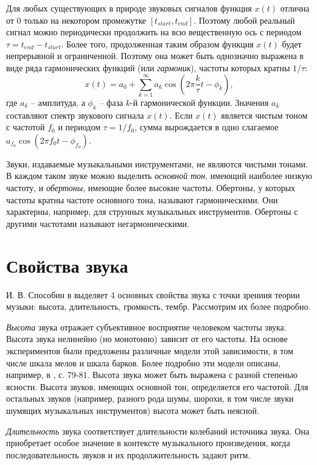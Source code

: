 Для любых существующих в природе звуковых сигналов функция $x(t)$ отлична от 0
только на некотором промежутке $[t_{start}, t_{end}]$. Поэтому любой реальный
сигнал можно периодически продолжить на всю вещественную ось с периодом $\tau =
t_{end} - t_{start}$. Более того, продолженная таким образом функция $x(t)$
будет непрерывной и ограниченной. Поэтому она может быть однозначно выражена в
виде ряда гармонических функций (или \emph{гармоник}), частоты которых кратны
$1 / \tau$: $$x(t) = a_0 + \sum_{k=1}^\infty a_k \cos \left(2\pi \frac{k}{\tau}
t - \phi_k \right),$$ где $a_k$ -- амплитуда, а $\phi_k$ -- фаза $k$-й
гармонической функции. Значения $a_k$ составляют спектр звукового сигнала
$x(t)$. Если $x(t)$ является чистым тоном с частотой $f_0$ и периодом $\tau =
1/f_0$, сумма вырождается в одно слагаемое $a_{f_0} \cos(2 \pi f_0 t -
\phi_{f_0})$.

Звуки, издаваемые музыкальными инструментами, не являются чистыми тонами. В
каждом таком звуке можно выделить \emph{основной тон}, имеющий наиболее низкую
частоту, и \emph{обертоны}, имеющие более высокие частоты. Обертоны, у которых
частоты кратны частоте основного тона, называют гармоническими. Они
характерны, например, для струнных музыкальных инструментов. Обертоны с другими
частотами называют негармоническими.

\section{Свойства звука} \label{sectT_prop}

И. В. Способин в \cite{Sposobin2012} выделяет 4 основных свойства звука с точки
зрениия теории музыки: высота, длительность, громкость, тембр. Рассмотрим их
более подробно.

\emph{Высота} звука отражает субъективное восприятие человеком частоты звука.
Высота звука нелинейно (но монотонно) зависит от его частоты. На основе
экспериментов были предложены различные модели этой зависимости, в том числе
шкала мелов и шкала барков. Более подробно эти модели описаны, например, в
\cite{Lerch2012}, с. 79-81. Высота звука может быть выражена с разной степенью
ясности. Высота звуков, имеющих основной тон, определяется его частотой. Для
остальных звуков (например, разного рода шумы, шорохи, в том числе звуки шумящих
музыкальных инструментов) высота может быть неясной.

\emph{Длительность} звука соответствует длительности колебаний источника звука.
Она приобретает особое значение в контексте музыкального произведения, когда
последовательность звуков и их продолжительность задают ритм.

